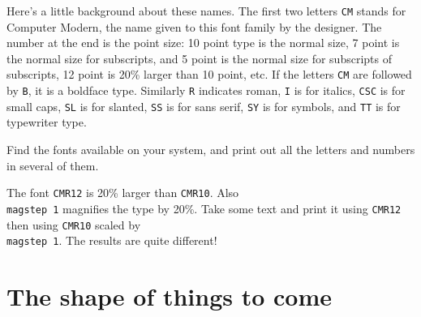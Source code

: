 \bigskip 
 
Here's a little background about these names.  The first two 
letters {\tt CM} stands for Computer Modern, the name given to 
this font family by the designer. The number at the end is the 
point size: 10 point type is the normal size, 7 point is the 
normal size for subscripts, and 5 point is the normal size for 
subscripts of subscripts, 12 point is 20\% larger than 10 point, 
etc. If the letters {\tt CM} are followed by {\tt B}, it is a 
boldface type.  Similarly {\tt R} indicates roman, {\tt I} is for 
italics, {\tt CSC} is for small caps, {\tt SL} is for slanted, 
{\tt SS} is for sans serif, {\tt SY} is for symbols, 
and {\tt TT} is for typewriter type. 
 
\exercise Find the fonts available on your system, and print out 
all the letters and numbers in several of them. 
 
\exercise The font {\tt CMR12} is 20\% larger than {\tt CMR10}. 
Also {\tt \\magstep~1} magnifies the type by 20\%.  Take some 
text and print it using {\tt CMR12} then using {\tt CMR10} scaled 
by {\tt \\magstep~1}. The results are quite different! 
 
 
 
 
\section{The shape of things to come} 
 
